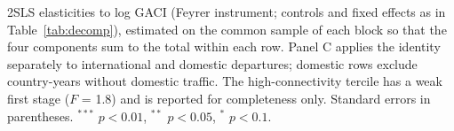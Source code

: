 \documentclass[12pt]{article}
\begin{document}
\begin{table}[htbp]
\begin{threeparttable}
\begin{tabular}{lccccccc}
\bottomrule
\end{tabular}
\begin{tablenotes}\scriptsize
\item 2SLS elasticities to log GACI (Feyrer instrument; controls and fixed effects as in Table~\ref{tab:decomp}), estimated on the common sample of each block so that the four components sum to the total within each row. Panel C applies the identity separately to international and domestic departures; domestic rows exclude country-years without domestic traffic. The high-connectivity tercile has a weak first stage ($F$ = 1.8) and is reported for completeness only. Standard errors in parentheses. $^{***}$ $p<0.01$, $^{**}$ $p<0.05$, $^{*}$ $p<0.1$.
\end{tablenotes}
\end{threeparttable}
\end{table}
\end{document}
